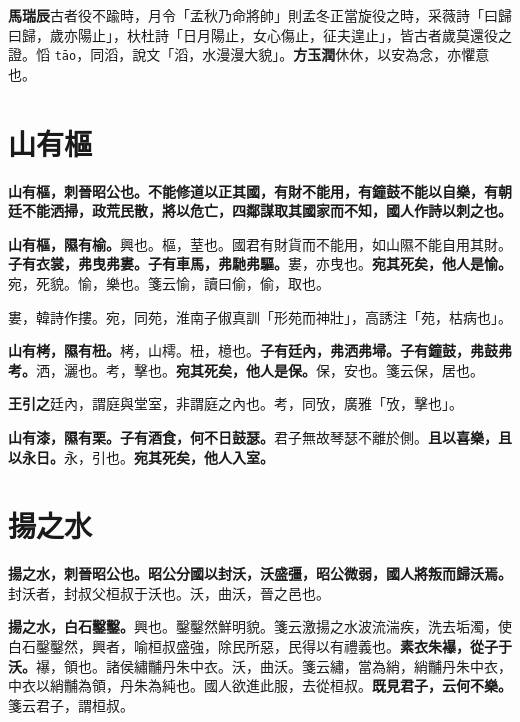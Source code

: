 \begin{quoting}\textbf{馬瑞辰}古者役不踰時，月令「孟秋乃命將帥」則孟冬正當旋役之時，采薇詩「曰歸曰歸，歲亦陽止」，杕杜詩「日月陽止，女心傷止，征夫遑止」，皆古者歲莫還役之證。慆 \texttt{tāo}，同滔，說文「滔，水漫漫大貌」。\textbf{方玉潤}休休，以安為念，亦懼意也。\end{quoting}

\section{山有樞}


\textbf{山有樞，刺晉昭公也。不能修道以正其國，有財不能用，有鐘鼓不能以自樂，有朝廷不能洒掃，政荒民散，將以危亡，四鄰謀取其國家而不知，國人作詩以刺之也。}

\textbf{山有樞，隰有榆。}{\footnotesize 興也。樞，荎也。國君有財貨而不能用，如山隰不能自用其財。}\textbf{子有衣裳，弗曳弗婁。子有車馬，弗馳弗驅。}{\footnotesize 婁，亦曳也。}\textbf{宛其死矣，他人是愉。}{\footnotesize 宛，死貌。愉，樂也。箋云愉，讀曰偷，偷，取也。}

\begin{quoting}婁，韓詩作摟。宛，同苑，淮南子俶真訓「形苑而神壯」，高誘注「苑，枯病也」。\end{quoting}

\textbf{山有栲，隰有杻。}{\footnotesize 栲，山樗。杻，檍也。}\textbf{子有廷內，弗洒弗埽。子有鐘鼓，弗鼓弗考。}{\footnotesize 洒，灑也。考，擊也。}\textbf{宛其死矣，他人是保。}{\footnotesize 保，安也。箋云保，居也。}

\begin{quoting}\textbf{王引之}廷內，謂庭與堂室，非謂庭之內也。考，同攷，廣雅「攷，擊也」。\end{quoting}

\textbf{山有漆，隰有栗。子有酒食，何不日鼓瑟。}{\footnotesize 君子無故琴瑟不離於側。}\textbf{且以喜樂，且以永日。}{\footnotesize 永，引也。}\textbf{宛其死矣，他人入室。}

\section{揚之水}


\textbf{揚之水，刺晉昭公也。昭公分國以封沃，沃盛彊，昭公微弱，國人將叛而歸沃焉。}{\footnotesize 封沃者，封叔父桓叔于沃也。沃，曲沃，晉之邑也。}

\textbf{揚之水，白石鑿鑿。}{\footnotesize 興也。鑿鑿然鮮明貌。箋云激揚之水波流湍疾，洗去垢濁，使白石鑿鑿然，興者，喻桓叔盛強，除民所惡，民得以有禮義也。}\textbf{素衣朱襮，從子于沃。}{\footnotesize 襮，領也。諸侯繡黼丹朱中衣。沃，曲沃。箋云繡，當為綃，綃黼丹朱中衣，中衣以綃黼為領，丹朱為純也。國人欲進此服，去從桓叔。}\textbf{既見君子，云何不樂。}{\footnotesize 箋云君子，謂桓叔。}


